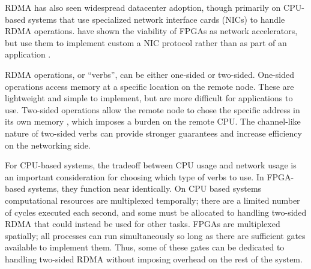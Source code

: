RDMA has also seen widespread datacenter adoption, though primarily on CPU-based systems that use specialized network interface cards (NICs) to handle RDMA operations. \citeauthor{star} have shown the viability of FPGAs as network accelerators, but use them to implement custom a NIC protocol rather than as part of an application \cite{star}.

RDMA operations, or ``verbs'', can be either one-sided or two-sided. One-sided operations access memory at a specific location on the remote node. These are lightweight and simple to implement, but are more difficult for applications to use. Two-sided operations allow the remote node to chose the specific address in its own memory \cite{base}, which imposes a burden on the remote CPU. The channel-like nature of two-sided verbs can provide stronger guarantees and increase efficiency on the networking side.

For CPU-based systems, the tradeoff between CPU usage and network usage is an important consideration for choosing which type of verbs to use. In FPGA-based systems, they function near identically. On CPU based systems computational resources are multiplexed temporally; there are a limited number of cycles executed each second, and some must be allocated to handling two-sided RDMA that could instead be used for other tasks. FPGAs are multiplexed spatially; all processes can run simultaneously so long as there are sufficient gates available to implement them. Thus, some of these gates can be dedicated to handling two-sided RDMA without imposing overhead on the rest of the system.
